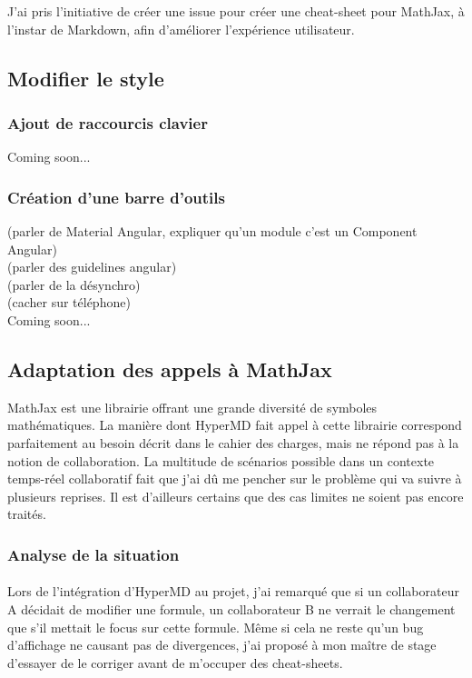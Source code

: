 \documentclass[12pt]{article}
\begin{document}
J'ai pris l'initiative de créer une issue pour créer une cheat-sheet pour MathJax, à l'instar de Markdown, afin d'améliorer l'expérience utilisateur.\\

\newpage
\subsection{Modifier le style}
\subsubsection{Ajout de raccourcis clavier}
Coming soon...

\subsubsection{Création d'une barre d'outils}
(parler de Material Angular, expliquer qu'un module c'est un Component Angular)\\
(parler des guidelines angular)\\
(parler de la désynchro)\\
(cacher sur téléphone)\\
Coming soon...

\newpage
\subsection{Adaptation des appels à MathJax}
MathJax est une librairie offrant une grande diversité de symboles mathématiques. La manière dont HyperMD fait appel à cette librairie correspond parfaitement au besoin décrit dans le cahier des charges, mais ne répond pas à la notion de collaboration. La multitude de scénarios possible dans un contexte temps-réel collaboratif fait que j'ai dû me pencher sur le problème qui va suivre à plusieurs reprises. Il est d'ailleurs certains que des cas limites ne soient pas encore traités.

\subsubsection{Analyse de la situation}
\paragraph{}
Lors de l'intégration d'HyperMD au projet, j'ai remarqué que si un collaborateur A décidait de modifier une formule, un collaborateur B ne verrait le changement que s'il mettait le focus sur cette formule. Même si cela ne reste qu'un bug d'affichage ne causant pas de divergences, j'ai proposé à mon maître de stage d'essayer de le corriger avant de m'occuper des cheat-sheets.
\end{document}
